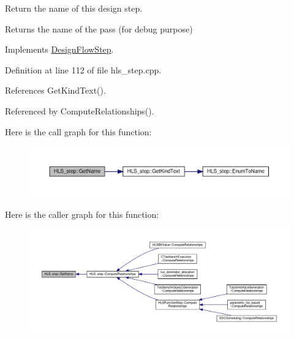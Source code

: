 Return the name of this design step. 

\begin{DoxyReturn}{Returns}
the name of the pass (for debug purpose) 
\end{DoxyReturn}


Implements \hyperlink{classDesignFlowStep_a01e5ebfab88db3b3b7f832f80075fad8}{Design\+Flow\+Step}.



Definition at line 112 of file hls\+\_\+step.\+cpp.



References Get\+Kind\+Text().



Referenced by Compute\+Relationships().

Here is the call graph for this function\+:
\nopagebreak
\begin{figure}[H]
\begin{center}
\leavevmode
\includegraphics[width=350pt]{da/d27/classHLS__step_aa60ee88fc2b3b180e118e8dee44f4044_cgraph}
\end{center}
\end{figure}
Here is the caller graph for this function\+:
\nopagebreak
\begin{figure}[H]
\begin{center}
\leavevmode
\includegraphics[width=350pt]{da/d27/classHLS__step_aa60ee88fc2b3b180e118e8dee44f4044_icgraph}
\end{center}
\end{figure}
\mbox{\label{classHLS__step_a93c15724812bc99bccd3c57bcb680295}} 
